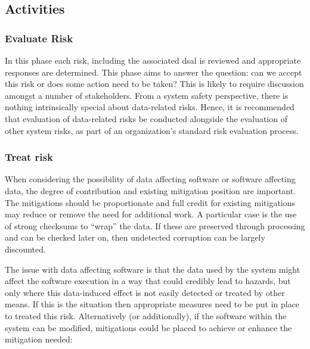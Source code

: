 \subsection{Activities}
\subsubsection{Evaluate Risk}
In this phase each risk, including the associated \gls{dsal} is reviewed and appropriate \glspl{response} are determined. This phase aims to answer the question: can we accept this risk or does some action need to be taken? This is likely to require discussion amongst a number of \glspl{stakeholder}. From a system safety perspective, there is nothing intrinsically special about data-related risks. Hence, it is recommended that evaluation of data-related risks be conducted alongside the evaluation of other system risks, as part of an organization's standard risk evaluation process.

\subsubsection{Treat risk}
When considering the possibility of data affecting software or software affecting data, the degree of contribution and existing \gls{mitigation} position are important. The \glspl{mitigation} should be proportionate and full credit for existing \glspl{mitigation} may reduce or remove the need for additional work. A particular case is the use of strong checksums to ``wrap'' the data. If these are preserved through processing and can be checked later on, then undetected  corruption can be largely discounted.

The issue with data affecting software is that the data used by the system might affect the software execution in a way that could credibly lead to \glspl{hazard}, but only where this data-induced effect is not easily detected or treated by other means. If this is the situation then appropriate measures need to be put in place  to treated this risk. Alternatively (or additionally), if the software within the system can be modified, \glspl{mitigation} could be placed  to achieve or enhance the \gls{mitigation} needed:

